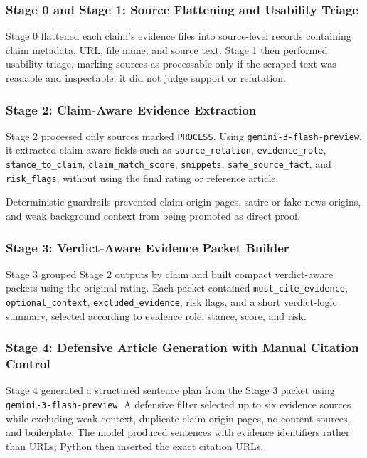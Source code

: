 \documentclass[
]{ceurart}
\begin{document}
\subsubsection{Stage 0 and Stage 1: Source Flattening and Usability Triage}

Stage 0 flattened each claim's evidence files into source-level records containing claim metadata, URL, file name, and source text. Stage 1 then performed usability triage, marking sources as processable only if the scraped text was readable and inspectable; it did not judge support or refutation.

\subsubsection{Stage 2: Claim-Aware Evidence Extraction}

Stage 2 processed only sources marked \texttt{PROCESS}. Using \texttt{gemini-3-flash-preview}, it extracted claim-aware fields such as \texttt{source\_relation}, \texttt{evidence\_role}, \texttt{stance\_to\_claim}, \texttt{claim\_match\_score}, \texttt{snippets}, \texttt{safe\_source\_fact}, and \texttt{risk\_flags}, without using the final rating or reference article.

Deterministic guardrails prevented claim-origin pages, satire or fake-news origins, and weak background context from being promoted as direct proof.

\subsubsection{Stage 3: Verdict-Aware Evidence Packet Builder}

Stage 3 grouped Stage 2 outputs by claim and built compact verdict-aware packets using the original rating. Each packet contained \texttt{must\_cite\_evidence}, \texttt{optional\_context}, \texttt{excluded\_evidence}, risk flags, and a short verdict-logic summary, selected according to evidence role, stance, score, and risk.

\subsubsection{Stage 4: Defensive Article Generation with Manual Citation Control}

Stage 4 generated a structured sentence plan from the Stage 3 packet using \texttt{gemini-3-flash-preview}. A defensive filter selected up to six evidence sources while excluding weak context, duplicate claim-origin pages, no-content sources, and boilerplate. The model produced sentences with evidence identifiers rather than URLs; Python then inserted the exact citation URLs.
\end{document}
